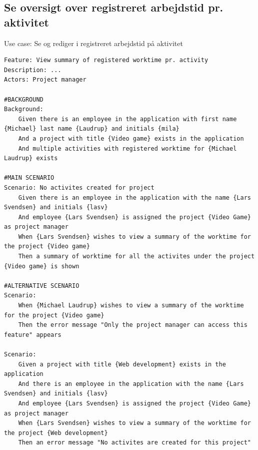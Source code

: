 \subsection{Se oversigt over registreret arbejdstid pr. aktivitet}
\begin{listing}[H]
    \centering
    \caption{Use case: Se og rediger i registreret arbejdstid på aktivitet}\label{lst:usecase_oversigt_over_registreret_arbejdstid_pr_aktivitet}
    \begin{verbatim}  
Feature: View summary of registered worktime pr. activity
Description: ...
Actors: Project manager

#BACKGROUND
Background: 
    Given there is an employee in the application with first name {Michael} last name {Laudrup} and initials {mila}
    And a project with title {Video game} exists in the application
    And multiple activities with registered worktime for {Michael Laudrup} exists

#MAIN SCENARIO
Scenario: No activites created for project
    Given there is an employee in the application with the name {Lars Svendsen} and initials {lasv}
    And employee {Lars Svendsen} is assigned the project {Video Game} as project manager
    When {Lars Svendsen} wishes to view a summary of the worktime for the project {Video game}
    Then a summary of worktime for all the activites under the project {Video game} is shown

#ALTERNATIVE SCENARIO
Scenario:  
    When {Michael Laudrup} wishes to view a summary of the worktime for the project {Video game}
    Then the error message "Only the project manager can access this feature" appears

Scenario: 
    Given a project with title {Web development} exists in the application
    And there is an employee in the application with the name {Lars Svendsen} and initials {lasv}
    And employee {Lars Svendsen} is assigned the project {Video Game} as project manager
    When {Lars Svendsen} wishes to view a summary of the worktime for the project {Web development}
    Then an error message "No activites are created for this project"

    \end{verbatim}
\end{listing}

